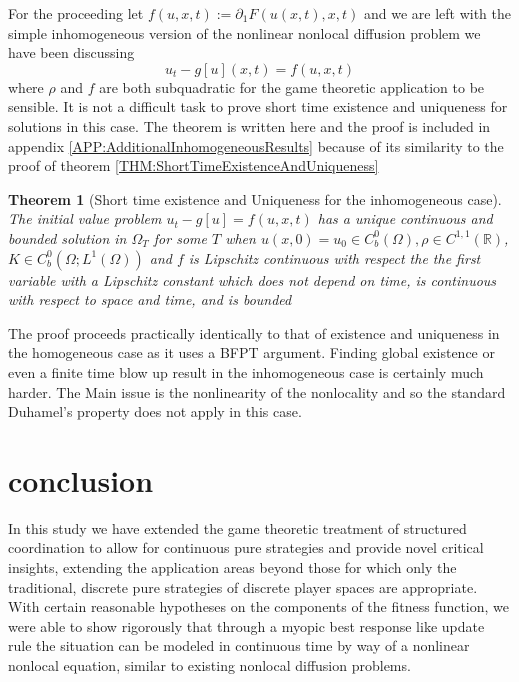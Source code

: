\documentclass[aps,
preprint,
groupedaddress,
showkeys,
amsmath]{revtex4-2}
\newtheorem{theorem}{Theorem}
\begin{document}
    For the proceeding let $f(u,x,t):=\partial_1F(u(x,t),x,t)$ and we are left with the simple inhomogeneous version of the nonlinear nonlocal diffusion problem we have been discussing
    \begin{equation}\label{inhom}
        u_t-g[u](x,t) =f(u,x,t)
    \end{equation}
    where $\rho$ and $f$ are both subquadratic for the game theoretic application to be sensible. It is not a difficult task to prove short time existence and uniqueness for solutions in this case. The theorem is written here and the proof is included in appendix \ref{APP:AdditionalInhomogeneousResults} because of its similarity to the proof of theorem \ref{THM:ShortTimeExistenceAndUniqueness}

    \begin{theorem}[Short time existence and Uniqueness for the inhomogeneous case]\label{THM:InhomogeneousExistenceAndUniqueness}
    The initial value problem $u_t-g[u]=f(u,x,t)$ has a unique continuous and bounded solution in $\Omega_T$ for some $T$ when $u(x,0)=u_0\in C_b^0(\Omega), \rho\in C^{1,1}(\mathbb{R})$, $K\in C^0_b(\Omega;L^1(\Omega))$ and $f$ is Lipschitz continuous with respect the the first variable with a Lipschitz constant which does not depend on time, is continuous with respect to space and time, and is bounded 
    \end{theorem}

    The proof proceeds practically identically to that of existence and uniqueness in the homogeneous case as it uses a BFPT argument. Finding global existence or even a finite time blow up result in the inhomogeneous case is certainly much harder. The Main issue is the nonlinearity of the nonlocality and so the standard Duhamel's property does not apply in this case. 

    \section{conclusion}\label{SEC:conclusion}
    In this study we have extended the game theoretic treatment of structured coordination to allow for continuous pure strategies and provide novel critical insights, extending the application areas beyond those for which only the traditional, discrete pure strategies of discrete player spaces are appropriate. With certain reasonable hypotheses on the components of the fitness function, we were able to show rigorously that through a myopic best response like update rule the situation can be modeled in continuous time by way of a nonlinear nonlocal equation, similar to existing nonlocal diffusion problems. 
\end{document}
